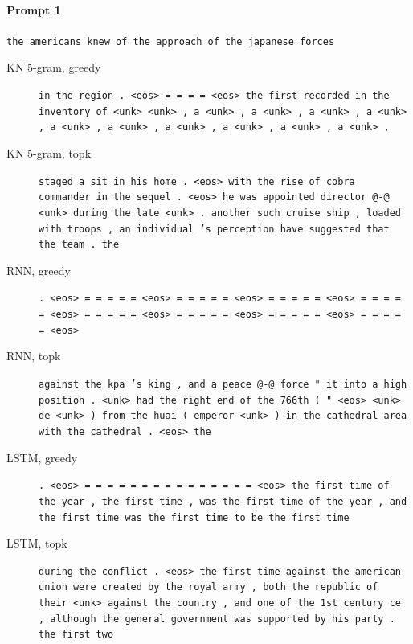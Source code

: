 \paragraph{Prompt 1} \texttt{the americans knew of the approach of the japanese forces}
\begin{description}
\item[KN 5-gram, greedy] \texttt{\small in the region . \textless{}eos\textgreater{} = = = = \textless{}eos\textgreater{} the first recorded in the inventory of \textless{}unk\textgreater{} \textless{}unk\textgreater{} , a \textless{}unk\textgreater{} , a \textless{}unk\textgreater{} , a \textless{}unk\textgreater{} , a \textless{}unk\textgreater{} , a \textless{}unk\textgreater{} , a \textless{}unk\textgreater{} , a \textless{}unk\textgreater{} , a \textless{}unk\textgreater{} , a \textless{}unk\textgreater{} , a \textless{}unk\textgreater{} ,}
\item[KN 5-gram, topk] \texttt{\small staged a sit in his home . \textless{}eos\textgreater{} with the rise of cobra commander in the sequel . \textless{}eos\textgreater{} he was appointed director @-@ \textless{}unk\textgreater{} during the late \textless{}unk\textgreater{} . another such cruise ship , loaded with troops , an individual 's perception have suggested that the team . the}
\item[RNN, greedy] \texttt{\small . \textless{}eos\textgreater{} = = = = = \textless{}eos\textgreater{} = = = = = \textless{}eos\textgreater{} = = = = = \textless{}eos\textgreater{} = = = = = \textless{}eos\textgreater{} = = = = = \textless{}eos\textgreater{} = = = = = \textless{}eos\textgreater{} = = = = = \textless{}eos\textgreater{} = = = = = \textless{}eos\textgreater{}}
\item[RNN, topk] \texttt{\small against the kpa 's king , and a peace @-@ force " it into a high position . \textless{}unk\textgreater{} had the right end of the 766th ( " \textless{}eos\textgreater{} \textless{}unk\textgreater{} de \textless{}unk\textgreater{} ) from the huai ( emperor \textless{}unk\textgreater{} ) in the cathedral area with the cathedral . \textless{}eos\textgreater{} the}
\item[LSTM, greedy] \texttt{\small . \textless{}eos\textgreater{} = = = = = = = = = = = = = = = \textless{}eos\textgreater{} the first time of the year , the first time , was the first time of the year , and the first time was the first time to be the first time}
\item[LSTM, topk] \texttt{\small during the conflict . \textless{}eos\textgreater{} the first time against the american union were created by the royal army , both the republic of their \textless{}unk\textgreater{} against the country , and one of the 1st century ce , although the general government was supported by his party . the first two}

\end{description}
